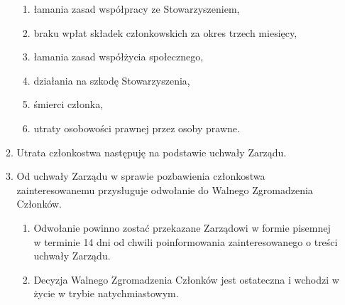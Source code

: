 \documentclass{article}
\begin{document}
\begin{enumerate}
\begin{enumerate}
\begin{enumerate}
            \item łamania zasad współpracy ze Stowarzyszeniem,
            \item braku wpłat składek członkowskich za okres trzech miesięcy,
            \item łamania zasad współżycia społecznego,
            \item działania na szkodę Stowarzyszenia,
            \item śmierci członka,
            \item utraty osobowości prawnej przez osoby prawne.
          \end{enumerate}
        \item Utrata członkostwa następuję na podstawie uchwały Zarządu.
        \item Od uchwały Zarządu w sprawie pozbawienia członkostwa zainteresowanemu przysługuje odwołanie do Walnego Zgromadzenia Członków.
          \begin{enumerate}
            \item Odwołanie powinno zostać przekazane Zarządowi w formie pisemnej w terminie 14 dni od chwili poinformowania zainteresowanego o treści uchwały Zarządu.
            \item Decyzja Walnego Zgromadzenia Członków jest ostateczna i wchodzi w życie w trybie natychmiastowym.
          \end{enumerate}
      \end{enumerate}
  \end{enumerate}
\end{document}
